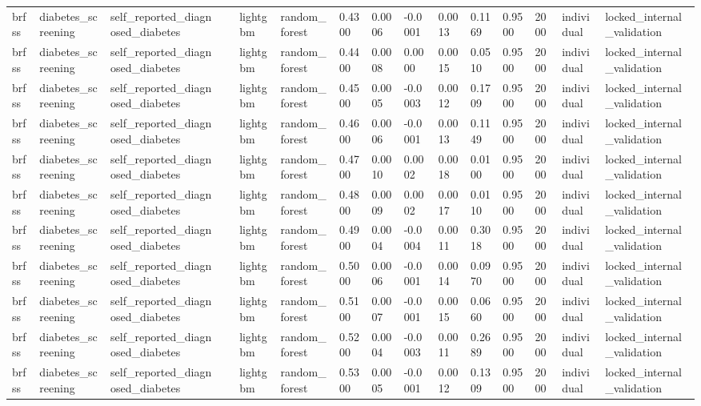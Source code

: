 \begin{tabular}{lllllllllllllll}
brfss & diabetes\_screening & self\_reported\_diagnosed\_diabetes &  & lightgbm & random\_forest & 0.4300 & 0.0006 & -0.0001 & 0.0013 & 0.1169 & 0.9500 & 2000 & individual & locked\_internal\_validation \\
brfss & diabetes\_screening & self\_reported\_diagnosed\_diabetes &  & lightgbm & random\_forest & 0.4400 & 0.0008 & 0.0000 & 0.0015 & 0.0510 & 0.9500 & 2000 & individual & locked\_internal\_validation \\
brfss & diabetes\_screening & self\_reported\_diagnosed\_diabetes &  & lightgbm & random\_forest & 0.4500 & 0.0005 & -0.0003 & 0.0012 & 0.1709 & 0.9500 & 2000 & individual & locked\_internal\_validation \\
brfss & diabetes\_screening & self\_reported\_diagnosed\_diabetes &  & lightgbm & random\_forest & 0.4600 & 0.0006 & -0.0001 & 0.0013 & 0.1149 & 0.9500 & 2000 & individual & locked\_internal\_validation \\
brfss & diabetes\_screening & self\_reported\_diagnosed\_diabetes &  & lightgbm & random\_forest & 0.4700 & 0.0010 & 0.0002 & 0.0018 & 0.0100 & 0.9500 & 2000 & individual & locked\_internal\_validation \\
brfss & diabetes\_screening & self\_reported\_diagnosed\_diabetes &  & lightgbm & random\_forest & 0.4800 & 0.0009 & 0.0002 & 0.0017 & 0.0110 & 0.9500 & 2000 & individual & locked\_internal\_validation \\
brfss & diabetes\_screening & self\_reported\_diagnosed\_diabetes &  & lightgbm & random\_forest & 0.4900 & 0.0004 & -0.0004 & 0.0011 & 0.3018 & 0.9500 & 2000 & individual & locked\_internal\_validation \\
brfss & diabetes\_screening & self\_reported\_diagnosed\_diabetes &  & lightgbm & random\_forest & 0.5000 & 0.0006 & -0.0001 & 0.0014 & 0.0970 & 0.9500 & 2000 & individual & locked\_internal\_validation \\
brfss & diabetes\_screening & self\_reported\_diagnosed\_diabetes &  & lightgbm & random\_forest & 0.5100 & 0.0007 & -0.0001 & 0.0015 & 0.0660 & 0.9500 & 2000 & individual & locked\_internal\_validation \\
brfss & diabetes\_screening & self\_reported\_diagnosed\_diabetes &  & lightgbm & random\_forest & 0.5200 & 0.0004 & -0.0003 & 0.0011 & 0.2689 & 0.9500 & 2000 & individual & locked\_internal\_validation \\
brfss & diabetes\_screening & self\_reported\_diagnosed\_diabetes &  & lightgbm & random\_forest & 0.5300 & 0.0005 & -0.0001 & 0.0012 & 0.1309 & 0.9500 & 2000 & individual & locked\_internal\_validation \\

\end{tabular}
